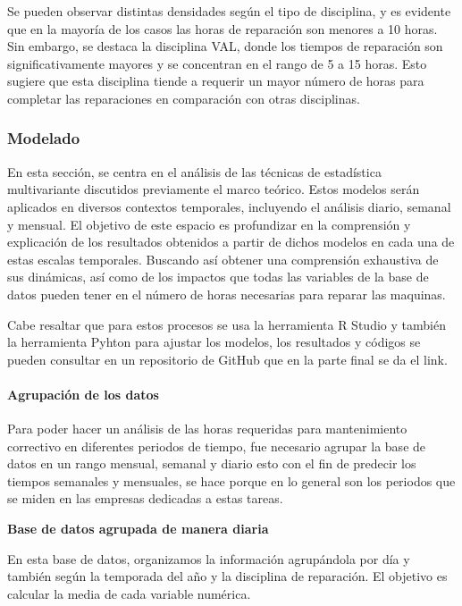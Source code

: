 \documentclass[
  11pt,
  bookmarksnumbered]{article}
\begin{document}
Se pueden observar distintas densidades según el tipo de disciplina, y es evidente que en la mayoría de los casos las horas de reparación son menores a 10 horas.
Sin embargo, se destaca la disciplina VAL, donde los tiempos de reparación son significativamente mayores y se concentran en el rango de 5 a 15 horas.
Esto sugiere que esta disciplina tiende a requerir un mayor número de horas para completar las reparaciones en comparación con otras disciplinas.

\newpage

\hypertarget{modelado}{%
\subsubsection{Modelado}\label{modelado}}

En esta sección, se centra en el análisis de las técnicas de estadística multivariante discutidos previamente el marco teórico.
Estos modelos serán aplicados en diversos contextos temporales, incluyendo el análisis diario, semanal y mensual.
El objetivo de este espacio es profundizar en la comprensión y explicación de los resultados obtenidos a partir de dichos modelos en cada una de estas escalas temporales.
Buscando así obtener una comprensión exhaustiva de sus dinámicas, así como de los impactos que todas las variables de la base de datos pueden tener en el número de horas necesarias para reparar las maquinas.

Cabe resaltar que para estos procesos se usa la herramienta R Studio y también la herramienta Pyhton para ajustar los modelos, los resultados y códigos se pueden consultar en un repositorio de GitHub que en la parte final se da el link.

\hypertarget{agrupaciuxf3n-de-los-datos}{%
\paragraph{Agrupación de los datos}\label{agrupaciuxf3n-de-los-datos}}

Para poder hacer un análisis de las horas requeridas para mantenimiento correctivo en diferentes periodos de tiempo, fue necesario agrupar la base de datos en un rango mensual, semanal y diario esto con el fin de predecir los tiempos semanales y mensuales, se hace porque en lo general son los periodos que se miden en las empresas dedicadas a estas tareas.

\textbf{Base de datos agrupada de manera diaria}

En esta base de datos, organizamos la información agrupándola por día y también según la temporada del año y la disciplina de reparación.
El objetivo es calcular la media de cada variable numérica.
\end{document}
